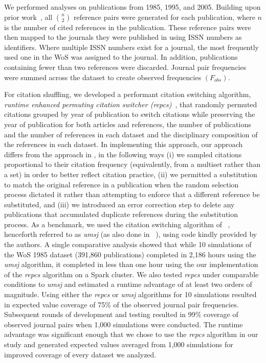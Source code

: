 \documentclass[NETN]{stjour}
\begin{document}
We performed analyses on publications from 1985, 1995, and 2005. Building upon prior work~\citep{uzzi_atypical_2013}, all ${n \choose 2}$ reference pairs were generated for each publication, where $n$ is the number of cited references in the publication. These reference pairs were then mapped to the journals they were published in using ISSN numbers as identifiers. Where multiple ISSN numbers exist for a journal, the most frequently used one in the WoS was assigned to the journal. In addition, publications containing fewer than two references were discarded. Journal pair frequencies were summed across the dataset to create observed frequencies $(F_{obs})$. 

For citation shuffling, we developed a performant citation switching algorithm, \emph{runtime enhanced permuting citation switcher (repcs)}~\citep{GithubERNIE2019}, that randomly permuted citations grouped by year of publication to switch citations while preserving the year of publication for both articles and references, the number of publications and the number of references in each dataset and the disciplinary composition of the references in each dataset. In implementing this approach, our approach differs from the approach in \cite{uzzi_atypical_2013}, in the following ways (i) we sampled citations proportional to their citation frequency (equivalently, from a multiset rather than a set) in order to better reflect citation practice,  (ii) we permitted a substitution to match the original reference in a publication when the random selection process dictated it rather than attempting to enforce that a different reference be substituted, and (iii) we introduced an error correction step to delete any publications that accumulated duplicate references during the substitution process. 
As a benchmark, we used the citation switching algorithm of ~\cite{uzzi_atypical_2013}, henceforth referred to  as \emph{umsj} (as also done in ~\cite{boyack_vs_uzzi_2014}), using code kindly provided by the authors. A single comparative analysis showed that while 10 simulations of the WoS 1985 dataset (391,860 publications) completed in 2,186 hours using the \emph{umsj} algorithm, it completed in less than one hour using the our implementation of the \emph{repcs}   algorithm on a Spark  cluster. We also tested \emph{repcs}  under comparable conditions to \emph{umsj} and estimated a runtime advantage of at least two orders of magnitude. Using either the \emph{repcs}   or \emph{umsj} algorithms for 10 simulations resulted in expected value coverage of 75\% of the observed journal pair frequencies. Subsequent rounds of development and testing resulted in 99\% coverage of observed journal pairs when 1,000 simulations were conducted. The runtime advantage was significant enough that we chose to use the \emph{repcs}   algorithm in our study  and generated expected values averaged from 1,000 simulations for improved coverage of every dataset we analyzed. 
\end{document}
